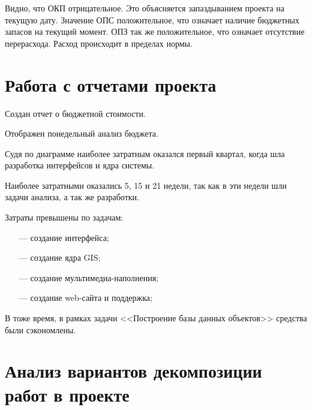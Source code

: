 Видно, что ОКП отрицательное. Это объясняется запаздыванием проекта на текущую дату.
Значение ОПС положительное, что означает наличие бюджетных запасов на текущий момент.
ОПЗ так же положительное, что означает отсутствие перерасхода. Расход происходит в пределах нормы.

\section{Работа с отчетами проекта}

Создан отчет о бюджетной стоимости.


\clearpage



Отображен понедельный анализ бюджета.


Судя по диаграмме наиболее затратным оказался первый квартал, когда шла разработка интерфейсов и ядра системы.

Наиболее затратными оказались 5, 15 и 21 недели, так как в эти недели шли задачи анализа, а так же разработки.


Затраты превышены по задачам:
\begin{itemize}
    \item[---] создание интерфейса;
    \item[---] создание ядра GIS;
    \item[---] создание мультимедиа-наполнения;
    \item[---] создание web-сайта и поддержка;
\end{itemize}

В тоже время, в рамках задачи <<Построение базы данных объектов>> средства были сэкономлены.


\clearpage

\section{Анализ вариантов декомпозиции
работ в проекте}

